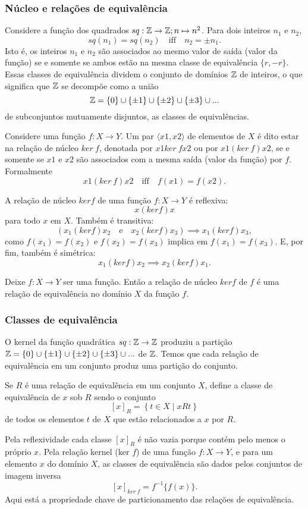 \subsubsection{Núcleo e relações de equivalência}
Considere a função dos quadrados $sq: \mathbb{Z} \to \mathbb{Z}; n\mapsto n^{2}$. Para dois inteiros $n_{1}$ e $n_{2}$, $$sq(n_{1}) = sq(n_{2})\quad \textrm{iff}\quad n_{2} = \pm n_{1}.$$
Isto é, os inteiros $n_{1}$ e $n_{2}$ são associados ao mesmo valor de saída (valor da função) se e somente se ambos estão na mesma classe de equivalência $\{r, -r\}$. Essas classes de equivalência dividem o conjunto de domínios $\mathbb{Z}$ de inteiros, o que significa que $\mathbb{Z}$ se decompõe como a união 
$$ \mathbb{Z} = \{0\} \cup \{\pm 1\} \cup \{\pm 2\} \cup \{\pm 3\} \cup ...$$
de subconjuntos mutuamente disjuntos, as classes de equivalências.
\begin{definition}
  Considere uma função $f: X \to Y$. Um par $\langle x{1}, x{2} \rangle$ de elementos de $X$ é dito estar na relação de núcleo $ker\ f$, denotada por $x{1} ker\ f x{2}$ ou por $x{1} (ker\ f) x{2}$, se e somente se $x{1}$ e $x{2}$ são associados com a mesma saída (valor da função) por $f$. Formalmente
  $$ x{1} (ker\ f) x{2}\quad \textrm{iff}\quad f(x{1}) = f(x{2}).$$
\end{definition}
A relação de núcleo $ker f$ de uma função $f: X \to Y$ é reflexiva: $$ x (ker f) x$$ para todo $x$ em $X$. Também é transitiva: $$\left(x_{1} (ker f) x_{2}\quad \textrm{e}\quad x_{2} (ker f) x_{3}\right) \implies x_{1} (ker f) x_{3},$$ como $f(x_{1}) = f(x_{2})$ e $f(x_{2}) = f(x_{3})$ implica em $f(x_{1}) = f(x_{3}).$ E, por fim, também é simétrica: $$ x_{1} (ker f) x_{2} \implies x_{2} (ker f) x_{1}.$$
\begin{stat}
  Deixe $f: X \to Y$ ser uma função. Então a relação de núcleo $ker f$ de $f$ é uma relação de equivalência no domínio $X$ da função $f$.
\end{stat}

\subsubsection{Classes de equivalência}
O kernel da função quadrática $sq: \mathbb{Z} \to \mathbb{Z}$ produziu a partição $ \mathbb{Z} = \{0\} \cup \{\pm 1\} \cup \{\pm 2\} \cup \{\pm 3\} \cup ...$ de $\mathbb{Z}$. Temos que cada relação de equivalência em um conjunto produz uma partição do conjunto.

\begin{definition}
  Se $R$ é uma relação de equivalência em um conjunto $X$, define a classe de equivalência de $x$ sob $R$ sendo o conjunto $$ \left[x\right]_{R} = \left\{t \in X \mid x R t\right\}$$ de todos os elementos $t$ de $X$ que estão relacionados a $x$ por $R$.
\end{definition}
Pela reflexividade cada classe $\left[x\right]_{R}$ é não vazia porque contém pelo menos o próprio $x$. Pela relação kernel (ker $f$) de uma função $f: X\to Y$, e para um elemento $x$ do domínio $X$, as classes de equivalência são dados pelos conjuntos de imagem inversa $$\left[x\right]_{ker\ f} = f^{-1}\{f(x)\}.$$ Aqui está a propriedade chave de particionamento das relações de equivalência.


